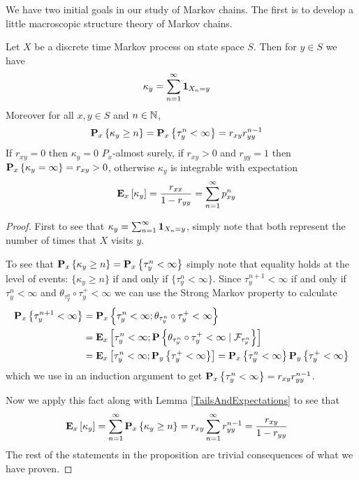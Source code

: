 We have two initial goals in our study of Markov chains.  The first is
to develop a little macroscopic structure theory of Markov chains.

\begin{prop}\label{RecurrenceTransienceDiscreteTime}Let $X$ be a discrete time Markov process on state space
  $S$.  Then for $y \in S$ we have
\begin{align*}
\kappa_y &= \sum_{n=1}^\infty \characteristic{X_n = y}
\end{align*}
Moreover for all $x,y \in S$ and $n \in \naturals$,
\begin{align*}
\sprobability{\kappa_y \geq n}{x} &= \sprobability{\tau^n_y <
  \infty}{x} = r_{xy} r_{yy}^{n-1} 
\end{align*}
If $r_{xy} = 0$ then $\kappa_y = 0$  $P_x$-almost surely, if $r_{xy} > 0$ and
$r_{yy} = 1$ then $\sprobability{\kappa_y = \infty}{x} = r_{xy} > 0$, otherwise
$\kappa_y$ is integrable with expectation
\begin{align*}
\sexpectation{\kappa_y}{x} &= \frac{r_{xx}}{1 - r_{yy}} =
\sum_{n=1}^\infty p^n_{xy}
\end{align*}
\end{prop}
\begin{proof}
First to see that $\kappa_y = \sum_{n=1}^\infty \characteristic{X_n =
  y}$, simply note that both represent the number of times that $X$
visits $y$.
  
To see that $\sprobability{\kappa_y \geq n}{x} = \sprobability{\tau^n_y <
  \infty}{x}$ simply note that equality holds at the level of events: $\lbrace \kappa_y \geq n \rbrace$ if
and only if $\lbrace \tau^n_y <  \infty \rbrace$.  Since $\tau^{n+1}_y
< \infty$ if and only if $\tau^n_y < \infty$ and $\theta_{\tau^n_y}
\circ \tau^+_y < \infty$ we can use the Strong Markov property to
calculate
\begin{align*}
\sprobability{\tau^{n+1}_y < \infty}{x} &= \sprobability{\tau^{n}_y
  < \infty ; \theta_{\tau^n_y} \circ \tau^+_y < \infty } {x} \\
&=\sexpectation{\tau^{n}_y
  < \infty ; \cprobability{\mathcal{F}_{\tau^n_y}}{\theta_{\tau^n_y} \circ \tau^+_y < \infty}
} {x} \\
&=\sexpectation{\tau^{n}_y
  < \infty ; \sprobability{\tau^+_y < \infty}{y}} {x} = \sprobability{\tau^{n}_y
  < \infty} {x} \sprobability{\tau^+_y < \infty}{y}
\end{align*}
which we use in an induction argument to get $\sprobability{\tau^{n}_y <
  \infty}{x} =  r_{xy} r_{yy}^{n-1}$.

Now we apply this fact along with Lemma \ref{TailsAndExpectations} to
see that
\begin{align*}
\sexpectation{\kappa_y}{x} &= \sum_{n=1}^\infty \sprobability{\kappa_y
  \geq n}{x} = r_{xy} \sum_{n=1}^\infty r_{yy}^{n-1} = \frac{r_{xy}}{1-r_{yy}}
\end{align*}
The rest of the statements in the proposition are trivial consequences
of what we have proven.
\end{proof}
